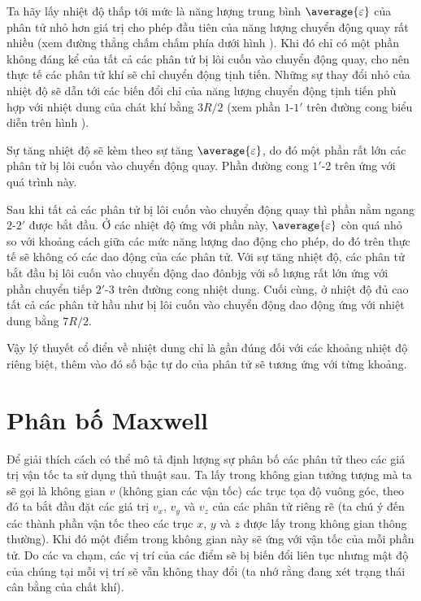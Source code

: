 Ta hãy lấy nhiệt độ thấp tới mức là năng lượng trung bình $\average{\varepsilon}$ của phân tử nhỏ hơn giá trị cho phép đầu tiên của năng lượng chuyển động quay rất nhiều (xem đường thẳng chấm chấm phía dưới hình ). Khi đó chỉ có một phần không đáng kể của tất cả các phân tử bị lôi cuốn vào chuyển động quay, cho nên thực tế các phân tử khí sẽ chỉ chuyển động tịnh tiến. Những sự thay đổi nhỏ của nhiệt độ sẽ dẫn tới các biến đổi chỉ của năng lượng chuyển động tịnh tiến phù hợp với nhiệt dung của chát khí bằng $3R/2$ (xem phần $1$-$1'$ trên đường cong biểu diễn trên hình ).

Sự tăng nhiệt độ sẽ kèm theo sự tăng $\average{\varepsilon}$, do đó một phần rất lớn các phân tử bị lôi cuốn vào chuyển động quay. Phần đường cong $1'$-$2$ trên  ứng với quá trình này.



Sau khi tất cả các phân tử bị lôi cuốn vào chuyển động quay thì phần nằm ngang $2$-$2'$ được bắt đầu. Ở các nhiệt độ ứng với phần này, $\average{\varepsilon}$ còn quá nhỏ so với khoảng cách giữa các mức năng lượng dao động cho phép, do đó trên thực tế sẽ không có các dao động của các phân tử. Với sự tăng nhiệt độ, các phân tử bắt đầu bị lôi cuốn vào chuyển động dao đônbjg với số lượng rất lớn ứng với phần chuyển tiếp $2'$-$3$ trên đường cong nhiệt dung. Cuối cùng, ở nhiệt độ đủ cao tất cả các phân tử hầu như bị lôi cuốn vào chuyển động dao động ứng với nhiệt dung bằng $7R/2$.

Vậy lý thuyết cổ điển về nhiệt dung chỉ là gần đúng đối với các khoảng nhiệt độ riêng biệt, thêm vào đó số bậc tự do của phân tử sẽ tương ứng với từng khoảng.



\section{Phân bố Maxwell}\label{sec:11_6}

Để giải thích cách có thể mô tả định lượng sự phân bố các phân tử theo các giá trị vận tốc ta sử dụng thủ thuật sau. Ta lấy trong không gian tưởng tượng mà ta sẽ gọi là không gian $v$ (không gian các vận tốc) các trục tọa độ vuông góc, theo đó ta bắt đầu đặt các giá trị $v_x$, $v_y$ và $v_z$ của các phân tử riêng rẽ (ta chú ý đến các thành phần vận tốc theo các trục $x$, $y$ và $z$ được lấy trong không gian thông thường). Khi đó một điểm trong không gian này sẽ ứng với vận tốc của mỗi phần tử. Do các va chạm, các vị trí của các điểm sẽ bị biến đổi liên tục nhưng mật độ của chúng tại mỗi vị trí sẽ vẫn không thay đổi (ta nhớ rằng đang xét trạng thái cân bằng của chất khí).


